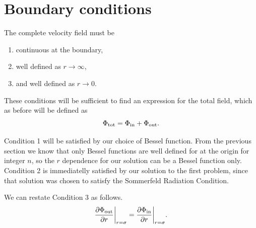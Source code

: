 \section{Boundary conditions}
The complete velocity field must be
  \begin{enumerate}
    \item continuous at the boundary,
    \item well defined as $r \rightarrow \infty$,
    \item and well defined as $r \rightarrow 0$.
  \end{enumerate}\par
%
These conditions will be sufficient to find an expression for the total field, which as before will be defined as
  \begin{equation}
    \Phi_{\text{tot}} = \Phi_{\text{in}} + \Phi_{\text{out}}.
  \end{equation}\par
%
Condition 1 will be satisfied by our choice of Bessel function. From the previous section we know that only Bessel functions are well defined for at the origin for integer $n$, so the $r$ dependence for our solution can be a Bessel function only.
%
Condition 2 is immediatelly satisfied by our solution to the first problem, since that solution was chosen to satisfy the Sommerfeld Radiation Condition. \par
%
We can restate Condition 3 as follows.
  \begin{equation}\label{eq:in_boundary_conditon}
    \frac{\partial \Phi_{\text{out}}}{\partial r}\bigg\vert_{r=\sigma} =  \frac{\partial \Phi_{\text{in}}}{\partial r}\bigg\vert_{r=\sigma}.
  \end{equation}\par
%
